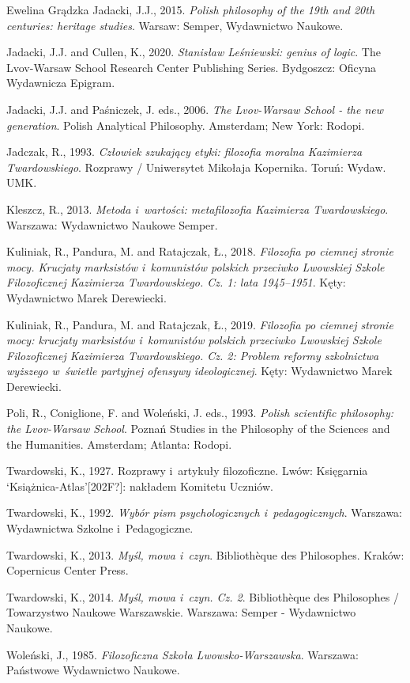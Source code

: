\begin{newrevengenv}{Ewelina Grądzka}
Jadacki, J.J., 2015. \textit{Polish philosophy of the 19th and 20th centuries: heritage studies}. Warsaw: Semper, Wydawnictwo Naukowe.

Jadacki, J.J. and Cullen, K., 2020. \textit{Stanisław Leśniewski: genius of logic}. The Lvov-Warsaw School Research Center Publishing Series. Bydgoszcz: Oficyna Wydawnicza Epigram.

Jadacki, J.J. and Paśniczek, J. eds., 2006. \textit{The Lvov-Warsaw School - the new generation}. Polish Analytical Philosophy. Amsterdam; New York: Rodopi.

Jadczak, R., 1993. \textit{Człowiek szukający etyki: filozofia moralna Kazimierza Twardowskiego}. Rozprawy / Uniwersytet Mikołaja Kopernika. Toruń: Wydaw. UMK.

Kleszcz, R., 2013. \textit{Metoda i~wartości: metafilozofia Kazimierza Twardowskiego}. Warszawa: Wydawnictwo Naukowe Semper.

Kuliniak, R., Pandura, M. and Ratajczak, Ł., 2018. \textit{Filozofia po ciemnej stronie mocy. Krucjaty marksistów i~komunistów polskich przeciwko Lwowskiej Szkole Filozoficznej Kazimierza Twardowskiego. Cz. 1: lata 1945–1951}. Kęty: Wydawnictwo Marek Derewiecki.

Kuliniak, R., Pandura, M. and Ratajczak, Ł., 2019. \textit{Filozofia po ciemnej stronie mocy: krucjaty marksistów i~komunistów polskich przeciwko Lwowskiej Szkole Filozoficznej Kazimierza Twardowskiego. Cz. 2: Problem reformy szkolnictwa wyższego w~świetle partyjnej ofensywy ideologicznej}. Kęty: Wydawnictwo Marek Derewiecki.

Poli, R., Coniglione, F. and Woleński, J. eds., 1993. \textit{Polish scientific philosophy: the Lvov-Warsaw School}. Poznań Studies in the Philosophy of the Sciences and the Humanities. Amsterdam; Atlanta: Rodopi.

Twardowski, K., 1927. Rozprawy i~artykuły filozoficzne. Lwów: Księgarnia ‘Książnica-Atlas'[202F?]: nakładem Komitetu Uczniów.

Twardowski, K., 1992. \textit{Wybór pism psychologicznych i~pedagogicznych}. Warszawa: Wydawnictwa Szkolne i~Pedagogiczne.

Twardowski, K., 2013. \textit{Myśl, mowa i~czyn}. Bibliothèque des Philosophes. Kraków: Copernicus Center Press.

Twardowski, K., 2014. \textit{Myśl, mowa i~czyn. Cz. 2}. Bibliothèque des Philosophes / Towarzystwo Naukowe Warszawskie. Warszawa: Semper - Wydawnictwo Naukowe.

Woleński, J., 1985. \textit{Filozoficzna Szkoła Lwowsko-Warszawska}. Warszawa: Państwowe Wydawnictwo Naukowe.


\end{newrevengenv}
